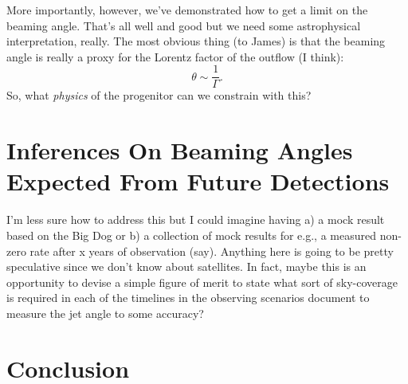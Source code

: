 \documentclass[twocolumn,nofootinbib]{revtex4}
\begin{document}
More importantly, however,  we've demonstrated how to get a limit on the beaming
angle.  That's all well and good but we need some astrophysical interpretation,
really.  The most obvious thing (to James) is that the beaming angle is really a
proxy for the Lorentz factor of the outflow (I think):
%
\begin{equation}
\theta \sim \frac{1}{\Gamma}.
\end{equation}
%
So, what \emph{physics} of the progenitor can we constrain with this?

\section{Inferences On Beaming Angles Expected From Future Detections}
I'm less sure how to address this but I could imagine having a) a mock result
based on the Big Dog or b) a collection of mock results for e.g., a measured
non-zero rate after x years of observation (say).  Anything here is going to be
pretty speculative since we don't know about satellites.  In fact, maybe this is
an opportunity to devise a simple figure of merit to state what sort of
sky-coverage is required in each of the timelines in the observing scenarios
document to measure the jet angle to some accuracy?

\section{Conclusion}


\end{document}
